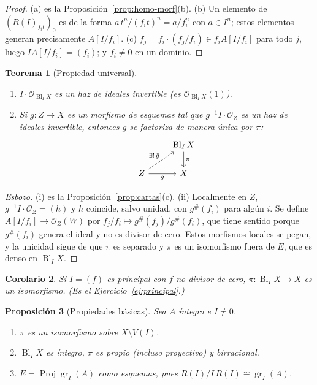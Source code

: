 \documentclass[11pt,a4paper]{article}
\newcommand{\Proj}{\operatorname{Proj}}
\newcommand{\Bl}{\operatorname{Bl}}
\newcommand{\gr}{\operatorname{gr}}
\newcommand{\cO}{\mathcal{O}}
\theoremstyle{plain}
\newtheorem{teorema}{Teorema}[section]
\newtheorem{proposicion}[teorema]{Proposición}
\newtheorem{corolario}[teorema]{Corolario}
\theoremstyle{definition}
\theoremstyle{remark}
\begin{document}
\begin{proof}
(a) es la Proposición~\ref{prop:homo-morf}(b). (b) Un elemento de $(R(I)_{f_it})_0$ es de la forma $a\,t^n/(f_it)^n=a/f_i^n$ con $a\in I^n$; estos elementos generan precisamente $A[I/f_i]$. (c) $f_j=f_i\cdot(f_j/f_i)\in f_iA[I/f_i]$ para todo $j$, luego $IA[I/f_i]=(f_i)$; y $f_i\ne0$ en un dominio.
\end{proof}

\begin{teorema}[Propiedad universal]\label{teo:universal}
\begin{enumerate}[label=(\roman*)]
\item $I\cdot\cO_{\Bl_IX}$ es un haz de ideales invertible (es $\cO_{\Bl_IX}(1)$).
\item Si $g\colon Z\to X$ es un morfismo de esquemas tal que $g^{-1}I\cdot\cO_Z$ es un haz de ideales invertible, entonces $g$ se factoriza de manera \emph{única} por $\pi$:
\[
\begin{tikzcd}
 & \Bl_IX \arrow[d,"\pi"] \\
 Z \arrow[r,"g"'] \arrow[ur,dashed,"\exists!\,\tilde g"] & X
\end{tikzcd}
\]
\end{enumerate}
\end{teorema}

\begin{proof}[Esbozo]
(i) es la Proposición~\ref{prop:cartas}(c). (ii) Localmente en $Z$, $g^{-1}I\cdot\cO_Z=(h)$ y $h$ coincide, salvo unidad, con $g^\#(f_i)$ para algún $i$. Se define $A[I/f_i]\to\cO_Z(W)$ por $f_j/f_i\mapsto g^\#(f_j)/g^\#(f_i)$, que tiene sentido porque $g^\#(f_i)$ genera el ideal y no es divisor de cero. Estos morfismos locales se pegan, y la unicidad sigue de que $\pi$ es separado y $\pi$ es un isomorfismo fuera de $E$, que es denso en $\Bl_IX$.
\end{proof}

\begin{corolario}
Si $I=(f)$ es principal con $f$ no divisor de cero, $\pi\colon\Bl_IX\to X$ es un isomorfismo. (Es el Ejercicio~\ref{ej:principal}.)
\end{corolario}

\begin{proposicion}[Propiedades básicas]\label{prop:basicas}
Sea $A$ íntegro e $I\ne0$.
\begin{enumerate}[label=(\alph*)]
\item $\pi$ es un isomorfismo sobre $X\setminus V(I)$.
\item $\Bl_IX$ es íntegro, $\pi$ es propio (incluso proyectivo) y birracional.
\item $E=\Proj\gr_I(A)$ como esquemas, pues $R(I)/I\,R(I)\cong\gr_I(A)$.
\end{enumerate}
\end{proposicion}
\end{document}
